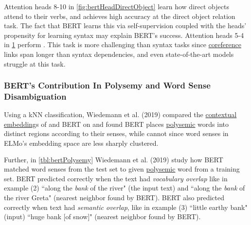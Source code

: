 \begin{figure}
\begin{minipage}{.35\textwidth}
  \vspace{-10pt}
  \label{fig:bertCoref}
\end{minipage}
\end{figure}


Attention heads 8-10 in \cref{fig:bertHeadDirectObject} learn how direct objects attend to their verbs, and achieves high accuracy at the direct object relation task. The fact that BERT learns this via self-supervision coupled with the heads' propensity for learning syntax may explain BERT's success. Attention heads 5-4 in \cref{fig:bertCoref} perform . This task is more challenging than syntax tasks since \hyperref[nlptask:coreferenceresolutionCR]{coreference} links span longer than syntax dependencies, and even state-of-the-art models struggle at this task.



\subsubsection{BERT's Contribution In Polysemy and Word Sense Disambiguation} %


Using a kNN classification, Wiedemann et al. (2019) compared the \hyperref[sec:SolutionWithContextEmbs]{contextual embedding}s of  and BERT on  and found BERT places \hyperref[sec:Polysemy]{polysemic} words into distinct regions according to their senses, while  cannot since word senses in ELMo's embedding space are less sharply clustered.

Further, in \cref{tbl:bertPolysemy} Wiedemann et al. (2019) study how BERT matched word senses from the test set to given \hyperref[sec:Polysemy]{polysemic} word from a training set. BERT predicted correctly when the text had \emph{vocabulary overlap} like in example (2) ``along the \emph{bank} of the river" (the input text) and ``along the \emph{bank} of the river Greta" (nearest neighbor found by BERT). BERT also predicted correctly when text had \emph{semantic overlap}, like in example (3) ``little earthy bank" (input) ``huge bank [of snow]" (nearest neighbor found by BERT). 



